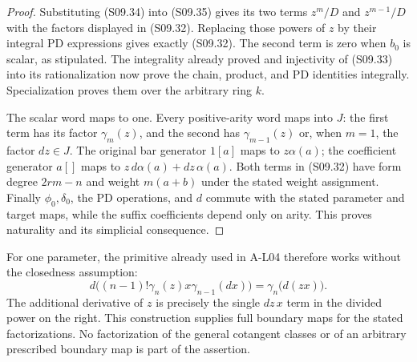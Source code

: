 \begin{proof}
Substituting (S09.34) into (S09.35) gives its two terms
$z^m/D$ and $z^{m-1}/D$ with the factors displayed
in (S09.32).  Replacing those powers of $z$ by their
integral PD expressions gives exactly (S09.32).
The second term is zero when $b_0$ is scalar, as stipulated.
The integrality already proved and injectivity of
(S09.33) into its rationalization now prove the chain,
product, and PD identities integrally.  Specialization
proves them over the arbitrary ring $k$.

The scalar word maps to one.  Every positive-arity
word maps into $J$: the first term has its factor
$\gamma_m(z)$, and the second has $\gamma_{m-1}(z)$
or, when $m=1$, the factor $dz\in J$.
The original bar generator $1[a]$ maps to $z\alpha(a)$;
the coefficient generator $a[]$ maps to
$z\,d\alpha(a)+dz\,\alpha(a)$.
Both terms in (S09.32) have form degree $2rm-n$ and
weight $m(a+b)$ under the stated weight assignment.
Finally $\phi_0,\delta_0$, the PD operations, and $d$
commute with the stated parameter and target maps,
while the suffix coefficients depend only on arity.
This proves naturality and its simplicial consequence.
\end{proof}

For one parameter, the primitive already used in A-L04
therefore works without the closedness assumption:
\[
 d\bigl((n-1)!\gamma_n(z)x\gamma_{n-1}(dx)\bigr)
                    =\gamma_n\bigl(d(zx)\bigr).
\]
The additional derivative of $z$ is precisely the
single $dz\,x$ term in the divided power on the right.
This construction supplies full boundary maps for the
stated factorizations.  No factorization of the general
cotangent classes or of an arbitrary prescribed
boundary map is part of the assertion.
